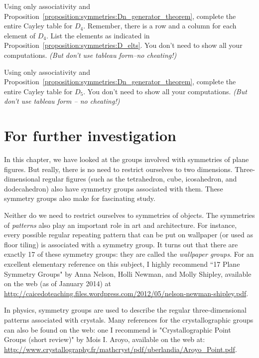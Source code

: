  \begin{exercise}{44}
Using only associativity and Proposition~\ref{proposition:symmetries:Dn_generator_theorem}, complete the entire Cayley table for $D_4$.  Remember, there is a row and a column for each element of $D_4$. List the elements as indicated in Proposition~\ref{proposition:symmetries:D_elts}. You don't need to show all your computations. \emph{(But don't use tableau form--no cheating!)} 
\end{exercise}

 \begin{exercise}{}
Using only associativity and Proposition~\ref{proposition:symmetries:Dn_generator_theorem}, complete the entire Cayley table for $D_5$.  You don't need to show all your computations. \emph{(But don't use tableau form -- no cheating!)} 
\end{exercise}

\section{For further investigation}
In this chapter, we have looked at the groups involved with symmetries of plane figures. But really, there is no need to restrict ourselves to two dimensions. Three-dimensional regular figures (such as the tetrahedron, cube, icosahedron, and dodecahedron) also have symmetry groups associated with them. These symmetry groups also make for fascinating study.

Neither do we need to restrict ourselves to symmetries of objects. The symmetries of \emph{patterns} also play an important role in art and architecture.  For instance, every possible regular repeating pattern that can be put on wallpaper (or used as floor tiling) is associated with a symmetry group. It turns out that there are exactly 17 of these symmetry groups: they are called the \emph{wallpaper groups}. For an excellent elementary reference on this subject, I highly recommend ``17 Plane Symmetry Groups" by Anna Nelson, Holli Newman, and Molly Shipley, available on the web (as of January 2014) at \url{http://caicedoteaching.files.wordpress.com/2012/05/nelson-newman-shipley.pdf}. 

In physics, symmetry groups are used to describe the regular three-dimensional patterns associated with crystals. Many references for the crystallographic groups can also be found on the web: one I recommend is "Crystallographic Point Groups (short review)" by Mois I. Aroyo, available on the web at: \url{http://www.crystallography.fr/mathcryst/pdf/uberlandia/Aroyo_Point.pdf}.


